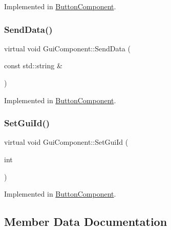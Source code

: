 Implemented in \mbox{\hyperlink{class_button_component_ab2bda034c7b604ed198d5c276b7fd045}{Button\+Component}}.

\mbox{\label{class_gui_component_a50da12b404e7ef1adbebafdabd66884f}} 
\subsubsection{\texorpdfstring{SendData()}{SendData()}\hspace{0.1cm}{\footnotesize\ttfamily [2/2]}}
{\footnotesize\ttfamily virtual void Gui\+Component\+::\+Send\+Data (\begin{DoxyParamCaption}\item[{const std\+::string \&}]{ }\end{DoxyParamCaption})\hspace{0.3cm}{\ttfamily [pure virtual]}}



Implemented in \mbox{\hyperlink{class_button_component_a4eb3aac3bc35d95f8d703da25697917c}{Button\+Component}}.

\mbox{\label{class_gui_component_a27d0d28dbc048b7cd3ad63e8a1961021}} 
\subsubsection{\texorpdfstring{SetGuiId()}{SetGuiId()}}
{\footnotesize\ttfamily virtual void Gui\+Component\+::\+Set\+Gui\+Id (\begin{DoxyParamCaption}\item[{int}]{ }\end{DoxyParamCaption})\hspace{0.3cm}{\ttfamily [pure virtual]}}



Implemented in \mbox{\hyperlink{class_button_component_a32986620f217bace2cbbd10fb73f34cd}{Button\+Component}}.



\subsection{Member Data Documentation}
\mbox{\label{class_gui_component_a8fb428ee8083cdaf7d1f9729a22bcf84}} 
